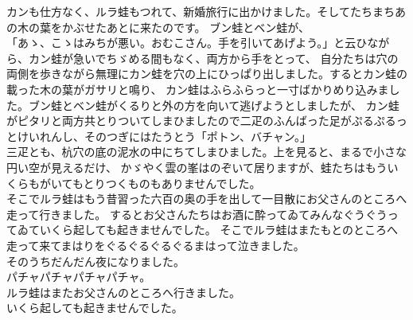 \documentclass[
a4paper,
10pt,
book]
{tarticle}
\begin{document}
\begin{linenumbers}
    \indent カンも仕方なく、ルラ蛙もつれて、新婚旅行に出かけました。そしてたちまちあの木の葉をかぶせたあとに来たのです。
    ブン蛙とベン蛙が、\\
    「あゝ、こゝはみちが悪い。おむこさん。手を引いてあげよう。」と云ひながら、カン蛙が急いでちゞめる間もなく、両方から手をとって、
    自分たちは穴の両側を歩きながら無理にカン蛙を穴の上にひっぱり出しました。するとカン蛙の載った木の葉がガサリと鳴り、
    カン蛙はふらふらっと一寸ばかりめり込みました。ブン蛙とベン蛙がくるりと外の方を向いて逃げようとしましたが、
    カン蛙がピタリと両方共とりついてしまひましたので二疋のふんばった足がぷるぷるっとけいれんし、そのつぎにはたうとう「ポトン、バチャン。」\\
    \indent 三疋とも、杭穴の底の泥水の中にちてしまひました。上を見ると、まるで小さな円い空が見えるだけ、
    かゞやく雲の峯はのぞいて居りますが、蛙たちはもういくらもがいてもとりつくものもありませんでした。\\
    \indent そこでルラ蛙はもう昔習った六百の奥の手を出して一目散にお父さんのところへ走って行きました。
    するとお父さんたちはお酒に酔ってゐてみんなぐうぐうってゐていくら起しても起きませんでした。
    そこでルラ蛙はまたもとのところへ走って来てまはりをぐるぐるぐるぐるまはって泣きました。\\
    \indent そのうちだんだん夜になりました。\\
    \indent \indent \indent \indent パチャパチャパチャパチャ。\\
    \indent ルラ蛙はまたお父さんのところへ行きました。\\
    \indent いくら起しても起きませんでした。
\end{linenumbers}
\end{document}
